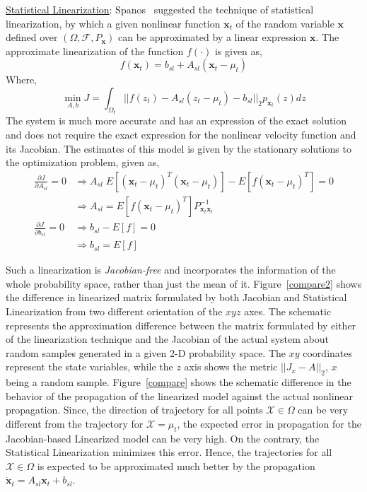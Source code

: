 \underline{Statistical Linearization}: Spanos~\cite{roberts1986stochastic} suggested the technique of statistical linearization, by which a given nonlinear function $\textbf{x}_t$ of the random variable $\textbf{x}$ defined over $(\Omega,\mathcal{F},P_{\textbf{x}})$ can be approximated by a linear expression $\textbf{x}$. The approximate linearization of the function $f(\cdot)$ is given as,
\begin{equation}
\label{lin_model}
f(\textbf{x}_t) = b_{sl} + A_{sl}(\textbf{x}_t - \mu_t)
\end{equation}
Where,
\begin{equation}
\min_{A,b} J =  \int_{\Omega_t} ||f(z_t) - A_{sl}(z_t - \mu_t) - b_{sl} ||_2 p_{\textbf{x}_t} (z) dz 
\end{equation}
The system is much more accurate and has an expression of the exact solution and does not require the exact expression for the nonlinear velocity function and its Jacobian. The estimates of this model is given by the stationary solutions to the optimization problem, given as,
\begin{equation}
\label{stat_lin}
\begin{array}{rl}
\displaystyle \frac{\partial J}{\partial A_{sl}} = 0  & \Rightarrow  A_{sl} \; E[(\textbf{x}_t - \mu_t)^T (\textbf{x}_t - \mu_t)] - E[f(\textbf{x}_t - \mu_t)^T] = 0\\
& \Rightarrow A_{sl} = E[f(\textbf{x}_t - \mu_t)^T] P_{\textbf{x}_t \textbf{x}_t}^{-1} \\
\displaystyle \frac{\partial J}{\partial b_{sl}} = 0  & \Rightarrow b_{sl} - E[f] = 0\\
& \Rightarrow b_{sl} = E[f] 
\end{array}
\end{equation}

Such a linearization is \textit{Jacobian-free} and incorporates the information of the whole probability space, rather than just the mean of it. Figure~\ref{compare2} shows the difference in linearized matrix formulated by both Jacobian and Statistical Linearization from two different orientation of the $xyz$ axes. The schematic represents the approximation difference between the matrix formulated by either of the linearization technique and the Jacobian of the actual system about random samples generated in a given 2-D probability space. The $xy$ coordinates represent the state variables, while the $z$ axis shows the metric $||J_x - A||_2$, $x$ being a random sample. Figure~\ref{compare} shows the schematic difference in the behavior of the propagation of the linearized model against the actual nonlinear propagation. Since, the direction of trajectory for all points $\mathcal{X} \in \Omega$ can be very different from the trajectory for $\mathcal{X} = \mu_t$, the expected error in propagation for the Jacobian-based Linearized model can be very high. On the contrary, the Statistical Linearization minimizes this error. Hence, the trajectories for all $\mathcal{X} \in \Omega$ is expected to be approximated much better by the propagation $\dot{\textbf{x}}_t = A_{sl} \textbf{x}_t + b_{sl}$.

